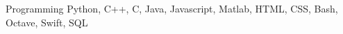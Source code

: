 \cvskill
    {Programming}
    {Python, C++, C, Java, Javascript, Matlab, HTML, CSS, Bash, Octave, Swift, SQL}
